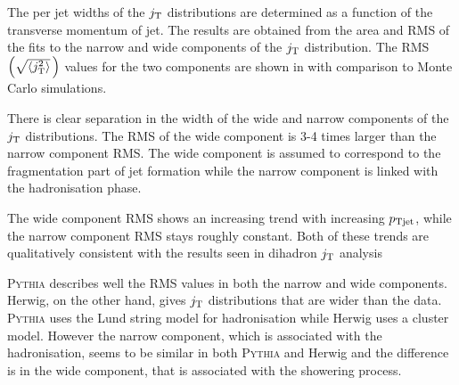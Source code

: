 
The per jet  widths of the $j_{\rm T}$ distributions are determined as a function of the transverse momentum of jet. The results are obtained from the area and RMS of the fits to the narrow and wide components of the $j_{\rm T}$ distribution. The RMS $\left(\sqrt{\left<j_{\rm T}^2\right>}\,\right)$ values for the two components are shown in  with comparison to Monte Carlo simulations.

There is clear separation in the width of the wide and narrow components of the $j_{\rm T}$ distributions. The RMS of the wide component is 3-4 times larger than the narrow component RMS. The wide component is assumed to correspond to the fragmentation part of jet formation while the narrow component is linked with the hadronisation phase.

The wide component RMS shows an increasing trend with increasing $p_{\rm Tjet}$, while the narrow component RMS stays roughly constant. Both of these trends are qualitatively consistent with the results seen in dihadron $j_{\rm T}$ analysis~\cite{ALICEjt}

\textsc{Pythia} describes well the RMS values in both the narrow and wide components. Herwig, on the other hand, gives $j_{\rm T}$ distributions that are wider than the data. \textsc{Pythia} uses the Lund string model for hadronisation while Herwig uses a cluster model. However the narrow component, which is associated with the hadronisation, seems to be similar in both \textsc{Pythia} and Herwig and the difference is in the wide component, that is associated with the showering process.

